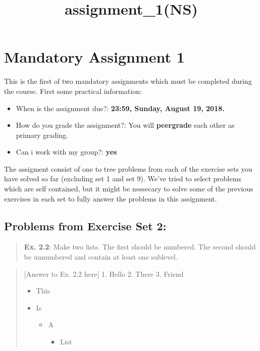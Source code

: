 \documentclass[11pt]{article}
\title{assignment\_1(NS)}
\providecommand{\tightlist}{%
      \setlength{\itemsep}{0pt}\setlength{\parskip}{0pt}}
\begin{document}
    
    
    \maketitle
    
    

    
    \section{Mandatory Assignment 1}\label{mandatory-assignment-1}

This is the first of two mandatory assignments which must be completed
during the course. First some practical information:

\begin{itemize}
\tightlist
\item
  When is the assignment due?: \textbf{23:59, Sunday, August 19, 2018.}
\item
  How do you grade the assignment?: You will \textbf{peergrade} each
  other as primary grading.
\item
  Can i work with my group?: \textbf{yes}
\end{itemize}

The assigment consist of one to tree problems from each of the exercise
sets you have solved so far (excluding set 1 and set 9). We've tried to
select problems which are self contained, but it might be nessecary to
solve some of the previous exercises in each set to fully answer the
problems in this assignment.

\subsection{Problems from Exercise Set
2:}\label{problems-from-exercise-set-2}

\begin{quote}
\textbf{Ex. 2.2}: Make two lists. The first should be numbered. The
second should be unnumbered and contain at least one sublevel.
\end{quote}

    \begin{quote}
{[}Answer to Ex. 2.2 here{]} 1. Hello 2. There 3. Friend

\begin{itemize}
\tightlist
\item
  This
\item
  Is

  \begin{itemize}
  \tightlist
  \item
    A

    \begin{itemize}
    \tightlist
    \item
      List
    \end{itemize}
  \end{itemize}
\end{itemize}
\end{quote}
\end{document}
